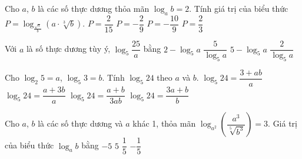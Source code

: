 \begin{ex}%
	Cho $a$, $b$ là các  số thực dương thỏa mãn $\log_ab=2$. Tính giá trị của biểu thức $P=\log_{\tfrac{\sqrt a}{b}}\left(a\cdot \sqrt[3]{b}\right)$.
	\choice 
		{$P=\dfrac{2}{15}$} 
		 {$P=-\dfrac{2}{9}$}
		{\True  $P=-\dfrac{10}{9}$}
		{$P=\dfrac{2}{3}$} 
\end{ex}

\begin{ex}%
	 Với $a$ là số thực dương tùy ý, $\log_5\dfrac{25}{a}$ bằng
	\choice 
		{\True  $2-\log_5a$}
		{$\dfrac{5}{\log_5a}$} 
		{$5-\log_5a$} 
		 {$\dfrac{2}{\log_5a}$}
\end{ex}

\begin{ex}%
	Cho $\log _2 5=a$, $ \log _5 3=b$. Tính $\log _5 24$ theo $a$ và  $b$.
	\choice 
		{\True $\log  _5 24=\dfrac{3+a b}{a}$}
		{$\log _5  24=\dfrac{a+3 b}{a}$}
		{$\log _5 24=\dfrac{a+b}{3 a b}$} 
		{$\log _5 24=\dfrac{3  a+b}{b}$}
\end{ex}

\begin{ex}%
	Cho $a$, $b$ là các số thực dương và $a$ khác 1, thỏa mãn $\log_{a^{2}}\left(\dfrac{a^{3}}{\sqrt[5]{b^{3}}}\right)=3$. Giá trị của biểu  thức $\log_{a}b$ bằng
	 \choice
		 {\True $-5$}
		{$5$} 
		{$\dfrac{1}{5}$} 
		 {$-\dfrac{1}{5}$}
\end{ex}

